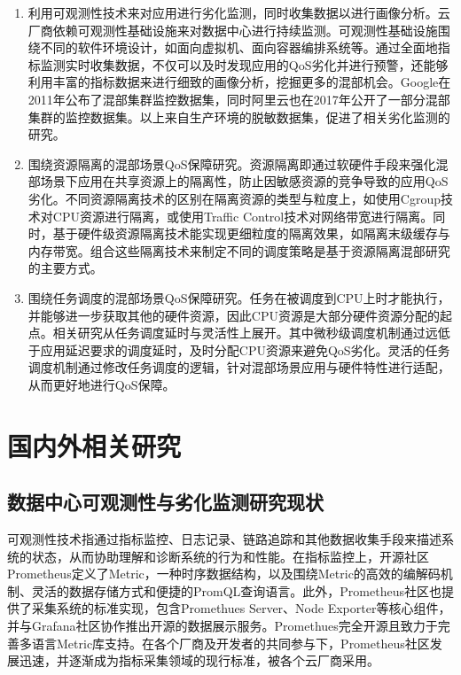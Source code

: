 \begin{enumerate}
    \item 利用可观测性技术来对应用进行劣化监测，同时收集数据以进行画像分析。云厂商依赖可观测性基础设施来对数据中心进行持续监测。可观测性基础设施围绕不同的软件环境设计，如面向虚拟机、面向容器编排系统等。通过全面地指标监测实时收集数据，不仅可以及时发现应用的QoS劣化并进行预警，还能够利用丰富的指标数据来进行细致的画像分析，挖掘更多的混部机会。Google在2011年公布了混部集群监控数据集，同时阿里云也在2017年公开了一部分混部集群的监控数据集\citep{guo2019limits}。以上来自生产环境的脱敏数据集，促进了相关劣化监测的研究。
    \item 围绕资源隔离的混部场景QoS保障研究。资源隔离即通过软硬件手段来强化混部场景下应用在共享资源上的隔离性，防止因敏感资源的竞争导致的应用QoS劣化。不同资源隔离技术的区别在隔离资源的类型与粒度上，如使用Cgroup技术对CPU资源进行隔离，或使用Traffic Control技术\citep{hubert2002linux}对网络带宽进行隔离。同时，基于硬件级资源隔离技术能实现更细粒度的隔离效果，如隔离末级缓存与内存带宽。组合这些隔离技术来制定不同的调度策略是基于资源隔离混部研究的主要方式。
    \item 围绕任务调度的混部场景QoS保障研究。任务在被调度到CPU上时才能执行，并能够进一步获取其他的硬件资源，因此CPU资源是大部分硬件资源分配的起点。相关研究从任务调度延时与灵活性上展开。其中微秒级调度机制通过远低于应用延迟要求的调度延时，及时分配CPU资源来避免QoS劣化。灵活的任务调度机制通过修改任务调度的逻辑，针对混部场景应用与硬件特性进行适配，从而更好地进行QoS保障。
\end{enumerate}

\section{国内外相关研究}

\subsection{数据中心可观测性与劣化监测研究现状}


可观测性技术指通过指标监控、日志记录、链路追踪和其他数据收集手段来描述系统的状态，从而协助理解和诊断系统的行为和性能。在指标监控上，开源社区Prometheus\citep{brazil2018prometheus}定义了Metric，一种时序数据结构，以及围绕Metric的高效的编解码机制、灵活的数据存储方式和便捷的PromQL查询语言。此外，Prometheus社区也提供了采集系统的标准实现，包含Promethues Server、Node Exporter等核心组件，并与Grafana社区协作推出开源的数据展示服务。Promethues完全开源且致力于完善多语言Metric库支持。在各个厂商及开发者的共同参与下，Prometheus社区发展迅速，并逐渐成为指标采集领域的现行标准，被各个云厂商采用。


